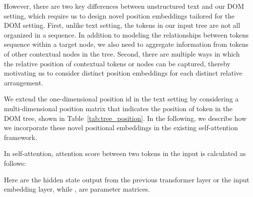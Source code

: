 \documentclass[sigconf, nonacm]{acmart}
\newcommand{\nop}[1]{}
\begin{document}
However, there are two key differences between unstructured text and our DOM setting, which require us to design novel position embeddings tailored for the DOM setting. First, unlike text setting, the tokens in our input tree are not all organized in a sequence. In addition to modeling the relationships between tokens sequence within a target node, we also need to aggregate information from tokens of other contextual nodes in the tree. Second, there are multiple ways in which the relative position of contextual tokens or nodes can be captured, thereby motivating us to consider distinct position embeddings for each distinct relative arrangement. 
\begin{table}[]
    \centering
    \caption{Various tree position features for a node/token.\nop{, each corresponding to one entry in the position matrix .}}\vspace{-10pt}
    \vspace{-5pt}
    \label{tab:tree_position}
\end{table}

We extend the one-dimensional position id  in the text setting by considering a multi-dimensional position matrix  that indicates the position of token  in the DOM tree, shown in Table~\ref{tab:tree_position}. In the following, we describe how we incorporate these novel positional embeddings in the existing self-attention framework.

In self-attention, attention score   between two tokens  in the input is calculated as follows:

Here  are the hidden state output from the previous transformer layer or the input embedding layer, while ,  are parameter matrices. 
\end{document}
